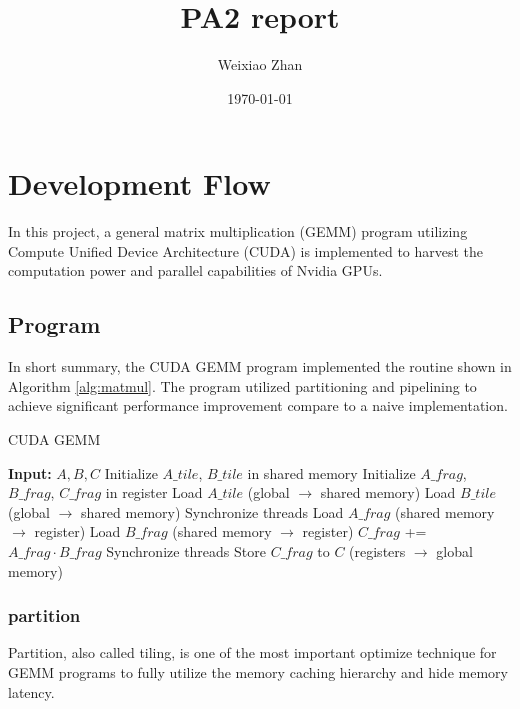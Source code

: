 \documentclass{article}
\begin{document}
\title{PA2 report}
\author{Weixiao Zhan}
\date{\today}
\maketitle

\section{Development Flow}

In this project, a general matrix multiplication (GEMM) program
utilizing Compute Unified Device Architecture (CUDA) is implemented
to harvest the computation power and parallel capabilities of Nvidia GPUs.

\subsection{Program}
In short summary, the CUDA GEMM program implemented the routine 
shown in Algorithm \ref{alg:matmul}. 
The program utilized partitioning and pipelining to
achieve significant performance improvement compare to a naive implementation.
\begin{algorithm}
\caption{CUDA GEMM}
\label{alg:matmul}
\begin{algorithmic}[1]
    \State \textbf{Input:} $A,B,C$
    \State Initialize $A\_tile$, $B\_tile$ in shared memory
    \State Initialize $A\_frag$, $B\_frag$, $C\_frag$ in register
        \State Load $A\_tile$ (global $\rightarrow$ shared memory)
        \State Load $B\_tile$ (global $\rightarrow$ shared memory)
        \State Synchronize threads
            \State Load $A\_frag$ (shared memory $\rightarrow$ register)
            \State Load $B\_frag$ (shared memory $\rightarrow$ register)
            \State $C\_frag$ += $A\_frag \cdot B\_frag$
        \EndFor
        \State Synchronize threads
    \EndFor
    \State Store $C\_frag$ to $C$ (registers $\rightarrow$ global memory)
\end{algorithmic}
\end{algorithm}


\subsubsection{partition}
\label{sec:partition}
Partition, also called tiling, is one of the most important optimize technique 
for GEMM programs to fully utilize the memory caching hierarchy
and hide memory latency.
\end{document}
